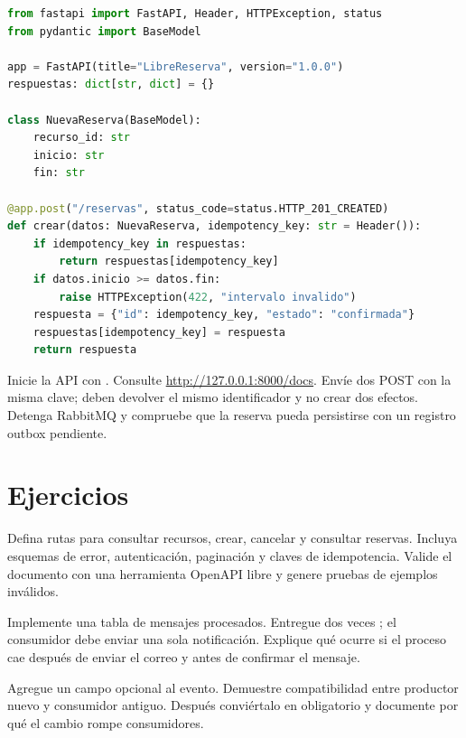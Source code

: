 \begin{lstlisting}[language=Python]
from fastapi import FastAPI, Header, HTTPException, status
from pydantic import BaseModel

app = FastAPI(title="LibreReserva", version="1.0.0")
respuestas: dict[str, dict] = {}

class NuevaReserva(BaseModel):
    recurso_id: str
    inicio: str
    fin: str

@app.post("/reservas", status_code=status.HTTP_201_CREATED)
def crear(datos: NuevaReserva, idempotency_key: str = Header()):
    if idempotency_key in respuestas:
        return respuestas[idempotency_key]
    if datos.inicio >= datos.fin:
        raise HTTPException(422, "intervalo invalido")
    respuesta = {"id": idempotency_key, "estado": "confirmada"}
    respuestas[idempotency_key] = respuesta
    return respuesta
\end{lstlisting}

\begin{validacion}
Inicie la API con . Consulte \url{http://127.0.0.1:8000/docs}. Envíe dos POST con la misma clave; deben devolver el mismo identificador y no crear dos efectos. Detenga RabbitMQ y compruebe que la reserva pueda persistirse con un registro outbox pendiente.
\end{validacion}

\section{Ejercicios}
\begin{ejercicio}[title={Ejercicio 1. Contrato OpenAPI}]
Defina rutas para consultar recursos, crear, cancelar y consultar reservas. Incluya esquemas de error, autenticación, paginación y claves de idempotencia. Valide el documento con una herramienta OpenAPI libre y genere pruebas de ejemplos inválidos.
\end{ejercicio}

\begin{ejercicio}[title={Ejercicio 2. Consumidor idempotente}]
Implemente una tabla de mensajes procesados. Entregue dos veces ; el consumidor debe enviar una sola notificación. Explique qué ocurre si el proceso cae después de enviar el correo y antes de confirmar el mensaje.
\end{ejercicio}

\begin{ejercicio}[title={Ejercicio 3. Compatibilidad}]
Agregue un campo opcional  al evento. Demuestre compatibilidad entre productor nuevo y consumidor antiguo. Después conviértalo en obligatorio y documente por qué el cambio rompe consumidores.
\end{ejercicio}
